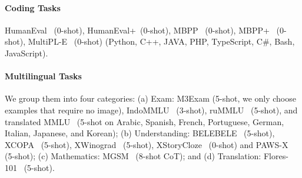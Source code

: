 \paragraph{Coding Tasks} HumanEval~\citep{humaneval} (0-shot), HumanEval+~\citep{evalplus}(0-shot), MBPP~\citep{mbpp} (0-shot), MBPP+~\citep{evalplus} (0-shot), MultiPL-E~\citep{multiple} (0-shot) (Python, C++, JAVA, PHP, TypeScript, C\#, Bash, JavaScript).

\paragraph{Multilingual Tasks} We group them into four categories: (a) Exam: M3Exam (5-shot, we only choose examples that require no image), IndoMMLU~\citep{koto-etal-2023-indommlu} (3-shot), ruMMLU~\citep{rummlu-mera} (5-shot), and translated MMLU~\citep{msift} (5-shot on Arabic, Spanish, French, Portuguese, German, Italian, Japanese, and Korean); (b) Understanding: BELEBELE~\citep{belebele} (5-shot), XCOPA~\citep{xcopa} (5-shot), XWinograd~\citep{xwinograd} (5-shot), XStoryCloze~\citep{xstory_cloze} (0-shot) and PAWS-X~\citep{paws-x} (5-shot); (c) Mathematics: MGSM~\citep{flores} (8-shot CoT); and (d) Translation: Flores-101~\citep{flores} (5-shot).


